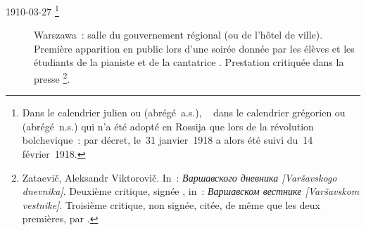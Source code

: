 \begin{description}
 \item[1910-03-27%
 \footnote{Dans le calendrier julien ou  (abrégé~a.s.),
 \cad{}~ dans le calendrier grégorien ou
  (abrégé~n.s.) qui n'a été adopté en Rossija que lors
 de la révolution bolchevique~: par décret, le~31 janvier~1918 a alors été
 suivi du~14 février~1918.\label{fn:ASNS}}]
 Warszawa~: salle du gouvernement régional (ou de l'hôtel de ville).
 Première apparition en public lors d'une soirée donnée par les élèves et
 les étudiants de la pianiste \ALebedevaGetsevich{} et de la cantatrice
 \VSviatlovskaya{}.
 Prestation critiquée dans la presse%
 \footnote{Zataevič, Aleksandr Viktorovič.
 In~: \emph{\foreignlanguage{russian}{Варшавского дневника} [Varšavskogo
 dnevnika]}.
 Deuxième critique, signée , in~:
 \emph{\foreignlanguage{russian}{Варшавском вестнике} [Varšavskom
 vestnike]}.
 Troisième critique, non signée, citée, de même que les deux premières, par
 \citet[p.~21]{Sofronitsky82a}.}.


\end{description}
